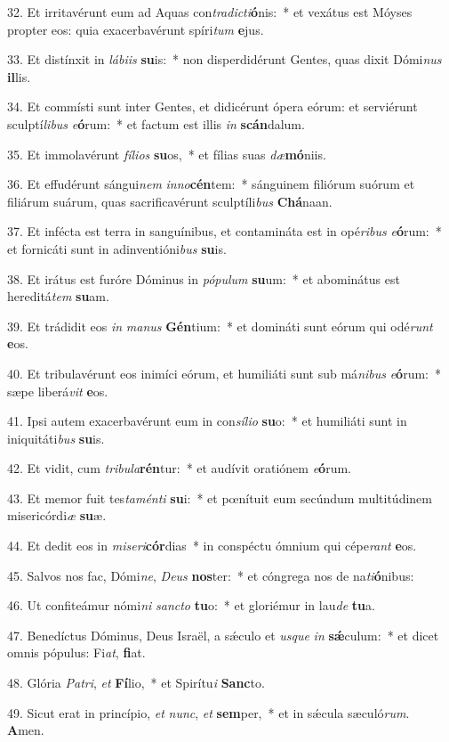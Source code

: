 32. Et irritavérunt eum ad Aquas con\textit{tra}\textit{dic}\textit{ti}\textbf{ó}nis:~*  et vexátus est Móyses propter eos: quia exacerbavérunt spíri\textit{tum} \textbf{e}jus.\

33. Et distínxit in \textit{lá}\textit{bi}\textit{is} \textbf{su}is:~*  non disperdidérunt Gentes, quas dixit Dómi\textit{nus} \textbf{il}lis.\

34. Et commísti sunt inter Gentes, et didicérunt ópera eórum: et serviérunt sculptí\textit{li}\textit{bus} \textit{e}\textbf{ó}rum:~*  et factum est illis \textit{in} \textbf{scán}dalum.\

35. Et immolavérunt \textit{fí}\textit{li}\textit{os} \textbf{su}os,~*  et fílias suas \textit{dæ}\textbf{mó}niis.\

36. Et effudérunt sángui\textit{nem} \textit{in}\textit{no}\textbf{cén}tem:~*  sánguinem filiórum suórum et filiárum suárum, quas sacrificavérunt sculptíli\textit{bus} \textbf{Chá}naan.\

37. Et infécta est terra in sanguínibus, et contamináta est in opé\textit{ri}\textit{bus} \textit{e}\textbf{ó}rum:~*  et fornicáti sunt in adinventióni\textit{bus} \textbf{su}is.\

38. Et irátus est furóre Dóminus in \textit{pó}\textit{pu}\textit{lum} \textbf{su}um:~*  et abominátus est hereditá\textit{tem} \textbf{su}am.\

39. Et trádidit eos \textit{in} \textit{ma}\textit{nus} \textbf{Gén}tium:~*  et domináti sunt eórum qui odé\textit{runt} \textbf{e}os.\

40. Et tribulavérunt eos inimíci eórum, et humiliáti sunt sub má\textit{ni}\textit{bus} \textit{e}\textbf{ó}rum:~*  sæpe liberá\textit{vit} \textbf{e}os.\

41. Ipsi autem exacerbavérunt eum in con\textit{sí}\textit{li}\textit{o} \textbf{su}o:~*  et humiliáti sunt in iniquitáti\textit{bus} \textbf{su}is.\

42. Et vidit, cum \textit{tri}\textit{bu}\textit{la}\textbf{rén}tur:~*  et audívit oratiónem \textit{e}\textbf{ó}rum.\

43. Et memor fuit tes\textit{ta}\textit{mén}\textit{ti} \textbf{su}i:~*  et pœnítuit eum secúndum multitúdinem misericórdi\textit{æ} \textbf{su}æ.\

44. Et dedit eos in \textit{mi}\textit{se}\textit{ri}\textbf{cór}dias~*  in conspéctu ómnium qui cépe\textit{rant} \textbf{e}os.\

45. Salvos nos fac, Dómi\textit{ne}, \textit{De}\textit{us} \textbf{nos}ter:~*  et cóngrega nos de na\textit{ti}\textbf{ó}nibus:\

46. Ut confiteámur nómi\textit{ni} \textit{sanc}\textit{to} \textbf{tu}o:~*  et gloriémur in lau\textit{de} \textbf{tu}a.\

47. Benedíctus Dóminus, Deus Israël, a sǽculo et \textit{us}\textit{que} \textit{in} \textbf{sǽ}culum:~*  et dicet omnis pópulus: Fi\textit{at}, \textbf{fi}at.\

48. Glória \textit{Pa}\textit{tri}, \textit{et} \textbf{Fí}lio,~*  et Spirítu\textit{i} \textbf{Sanc}to.\

49. Sicut erat in princípio, \textit{et} \textit{nunc}, \textit{et} \textbf{sem}per,~*  et in sǽcula sæculó\textit{rum}. \textbf{A}men.\

